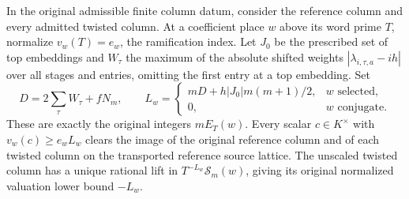 \begin{theorem}
\label{thm:actual-sharp-level}
In the original admissible finite column datum, consider the reference
column and every admitted twisted column. At a coefficient place $w$
above its word prime $T$, normalize $v_w(T)=e_w$, the ramification index.
Let $J_0$ be the prescribed set of top embeddings and $W_\tau$ the
maximum of the absolute shifted weights $|\lambda_{i,\tau,a}-ih|$
over all stages and entries, omitting the first entry at a top embedding.
Set
\[
 D=2\sum_\tau W_\tau+fN_m,\qquad
 L_w=\begin{cases}
 mD+h|J_0|m(m+1)/2,&w\text{ selected},\\
 0,&w\text{ conjugate}.
 \end{cases}
\]
These are exactly the original integers $mE_T(w)$. Every scalar
$c\in K^\times$ with $v_w(c)\ge e_wL_w$ clears the image of the
original reference column and of each twisted column on the
transported reference source lattice. The unscaled twisted column
has a unique rational lift in $T^{-L_w}\mathscr S_m(w)$, giving its
original normalized valuation lower bound $-L_w$.
\end{theorem}
